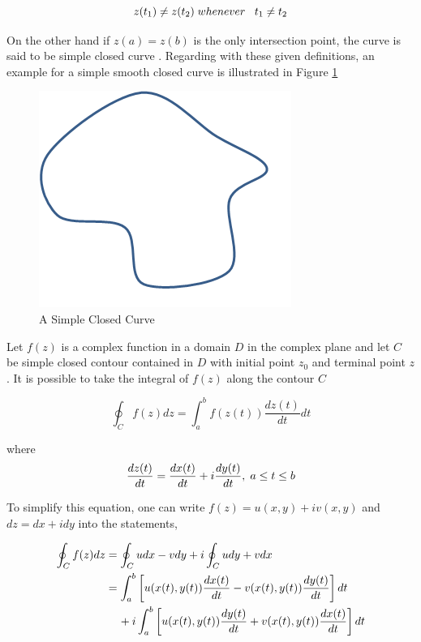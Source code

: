 \begin{equation} \label{crossitself}
z(t_1) \neq z(t_2)   \hspace{0.1cm} whenever   \hspace{0.3cm} t_1\neq t_2
\end{equation}
		
On the other hand if  $z(a)=z(b)$ is the only intersection point, the curve is said to be simple closed curve \cite{wiki_contour}. Regarding with these given definitions, an example for a  simple smooth closed curve is illustrated in Figure \ref{simple_closed_curve_ref}

\begin{figure}[H]
\caption{A Simple Closed Curve} \label{simple_closed_curve_ref}
\centering
\includegraphics[scale = 0.60]{simple_closed_curve}
\end{figure}
		
Let $f(z)$ is a complex function in a domain $D$ in the complex plane and let $C$ be simple closed contour contained in $D$ with initial point $z_0$ and terminal point  $z$. It is possible to take the integral of $f(z)$ along the contour $C$ \cite{wiki_contour}
		
\begin{equation}
\oint_C f(z) dz = \int_{a}^{b} f(z(t))\frac{dz(t)}{dt} dt
\end{equation}
		
where
\begin{equation}
\frac{dz(t)}{dt} = \frac{dx(t)}{dt} + i\frac{dy(t)}{dt},   \hspace{0.1cm} a\leq t\leq b
\end{equation}
		
To simplify this equation, one can write $f(z) = u(x,y) + iv(x,y)$ and $dz = dx + idy$ into the statements,
		
\begin{align} \label{contour_integral}
\begin{split}
\oint_C f(z)dz & = \oint_C u dx - v dy + i \oint_C u dy + v dx \\
&= \int_{a}^{b}\left[u(x(t),y(t) )\frac{dx(t)}{dt} - v(x(t),y(t) )\frac{dy(t)}{dt}\right]dt\\
& \hspace{0.4cm} + i\int_{a}^{b} \left[u(x(t),y(t) )\frac{dy(t)}{dt} + v(x(t),y(t) )\frac{dx(t)}{dt}\right]dt
\end{split}
\end{align}

